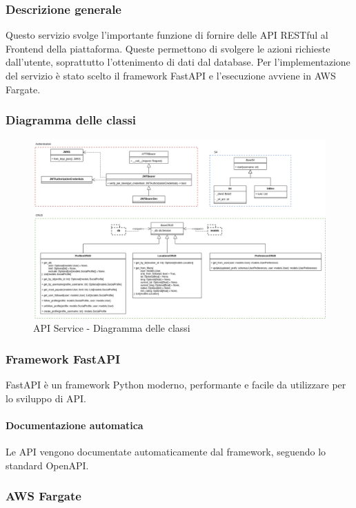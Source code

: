 \subsubsection{Descrizione generale}
Questo servizio svolge l'importante funzione di fornire delle API RESTful al Frontend della piattaforma.
Queste permettono di svolgere le azioni richieste dall'utente, soprattutto l'ottenimento di dati dal database.
Per l'implementazione del servizio è stato scelto il framework FastAPI e l'esecuzione avviene in AWS Fargate.

\subsubsection{Diagramma delle classi}
\begin{figure}[H]
    \includegraphics[width=16cm]{sezioni/images/cd_api.png}
    \centering
    \caption{API Service - Diagramma delle classi}
\end{figure}

\subsubsection{Framework FastAPI}
FastAPI è un framework Python moderno, performante e facile da utilizzare per lo sviluppo di API.

\paragraph{Documentazione automatica}\aCapo
Le API vengono documentate automaticamente dal framework, seguendo lo standard OpenAPI.

\subsubsection{AWS Fargate}

